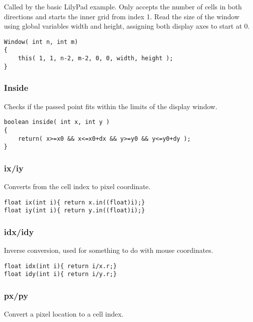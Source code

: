 \documentclass[notitlepage]{article}
\begin{document}
Called by the basic LilyPad example. Only accepts the number of cells in both directions
and starts the inner grid from index 1. Read the size of the window using
global variables width and height, assigning both display axes to start at 0.

\begin{lstlisting}[style=myCpp]
Window( int n, int m)
{
	this( 1, 1, n-2, m-2, 0, 0, width, height );
}
\end{lstlisting}

\subsubsection{Inside}

Checks if the passed point fits within the limits of the display window.

\begin{lstlisting}[style=myCpp]
boolean inside( int x, int y )
{
	return( x>=x0 && x<=x0+dx && y>=y0 && y<=y0+dy );
}
\end{lstlisting}

\subsubsection{ix/iy}

Converts from the cell index to pixel coordinate.

\begin{lstlisting}[style=myCpp]
float ix(int i){ return x.in((float)i);}
float iy(int i){ return y.in((float)i);}
\end{lstlisting}

\subsubsection{idx/idy}

Inverse conversion, used for something to do with mouse coordinates.

\begin{lstlisting}[style=myCpp]
float idx(int i){ return i/x.r;}
float idy(int i){ return i/y.r;}
\end{lstlisting}

\subsubsection{px/py}

Convert a pixel location to a cell index.
\end{document}
